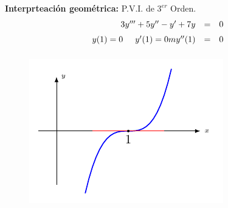 \documentclass{beamer}
\begin{document}
\begin{frame}[t]
	\begin{block}{}
		\textbf{Interprteación geométrica:} P.V.I. de \(3^{er}\) Orden.
		\[
			\begin{array}{rcl}
				3y''' +5y'' -y' +7y & = & 0 \\[2mm]
				y(1) =0 \hspace{5mm} y'(1) =0 m y'' (1) & = & 0 \\[2mm]
			\end{array}
		\]
		\begin{figure}[ht]
			\centering
			\includegraphics[width= 0.7 \linewidth]{IMAGENES/2/tikz.pdf}
		\end{figure}
	\end{block}
\end{frame}
\end{document}

